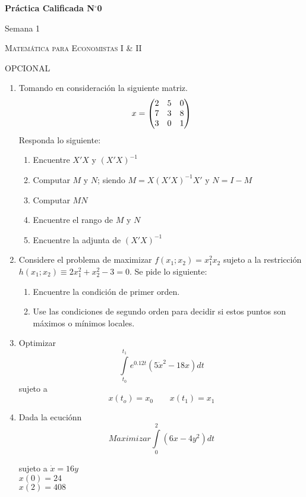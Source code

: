 \documentclass[12pt,a4paper]{article}
\begin{document}
	
	\begin{center}
		{\Large {\textbf{Práctica Calificada N$^{\circ}$0}}}
		
			\small{Semana 1}
		
				\textsc{Matemática para Economistas I \& II}
		
					OPCIONAL
	\end{center}

	\begin{enumerate}
		\item Tomando en consideración la siguiente matriz.
					\begin{equation}
						x = \begin{pmatrix}
								2 & 5 & 0\\
								7 & 3 & 8\\
								3 & 0 & 1
							\end{pmatrix}\notag
					\end{equation}
			  Responda lo siguiente:
					\begin{enumerate}
						\item Encuentre $X'X$ y $(X'X)^{-1}$
						\item Computar $M$ y $N$; siendo $M = X(X'X)^{-1}X'$ y $N = I - M$
						\item Computar $MN$
						\item Encuentre el rango de $M$ y $N$
						\item Encuentre la adjunta de $(X'X)^{-1}$
					\end{enumerate}
		\item Considere el problema de maximizar $f(x_1; x_2) = x_{1}^{2}x_2$ sujeto a la restricción $h(x_1; x_2) \equiv 2x_{1}^{2}+ x_{2}^{2} - 3 = 0$. Se pide lo siguiente:
					\begin{enumerate}
						\item Encuentre la condición de primer orden.
						\item Use las condiciones de segundo orden para decidir si estos puntos son máximos o
						mínimos locales.
					\end{enumerate}
		\item Optimizar $$\int\limits_{t_0}^{t_1} e^{0.12t}(5\dot{x}^{2}-18x)dt$$
			  sujeto a $$x(t_o) = x_0 \qquad x(t_1) = x_1$$
			  
		\item Dada la ecuciónn $$Maximizar \int\limits_{0}^{2}(6x-4y^2)dt$$
			  	\begin{center}
					sujeto a \hspace{0.65cm} $\dot{x} = 16y$\\
						  	 \hspace{1.5cm}  $x(0) = 24$\\
							 \hspace{1.72cm} $x(2) = 408$
			  	\end{center}
	\end{enumerate}
\end{document}
